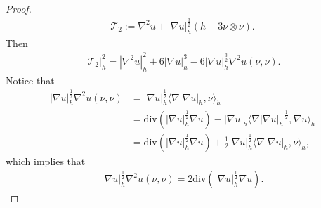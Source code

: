 \documentclass[letter]{amsart}
\theoremstyle{definition}
\theoremstyle{remark}
\begin{document}
\begin{proof}

\begin{align*}
	\mathcal{T}_2:= \nabla ^2 u + |\nabla u|_h^{\frac{3}{2}} (h - 3 \nu \otimes \nu ).
\end{align*}
Then
\begin{align}\label{T-tensor2}
	|\mathcal{T}_2|^2_h = |\nabla ^2u|^2_h + 6 |\nabla u|^{3}_h - 6 |\nabla u|^{\frac{3}{2}}_h \nabla ^2 u (\nu ,\nu ).
\end{align}
Notice that
\begin{align*}
	|\nabla u|^{\frac{1}{2}}_h \nabla ^2 u (\nu ,\nu ) &= |\nabla u|_h^{\frac{1}{2}} \langle \nabla |\nabla u|_h, \nu  \rangle_h\\
							   &= \mathrm{div} \left( |\nabla u|_h^{\frac{1}{2}} \nabla u \right) - |\nabla u|_h \langle \nabla |\nabla u|^{-\frac{1}{2}}_h, \nabla u \rangle_h\\
							   &= \mathrm{div} \left( |\nabla u|_h^{\frac{1}{2}} \nabla u \right) + \frac{1}{2} |\nabla u|_h^{\frac{1}{2}} \langle \nabla |\nabla u|_h, \nu  \rangle_h,
\end{align*}
which implies that
\begin{align}\label{div-id1}
	|\nabla u|^{\frac{1}{2}}_h \nabla ^2 u (\nu ,\nu ) = 2 \mathrm{div} \left( |\nabla u|_h^{\frac{1}{2}} \nabla u \right) .
\end{align}

\end{proof}
\end{document}
